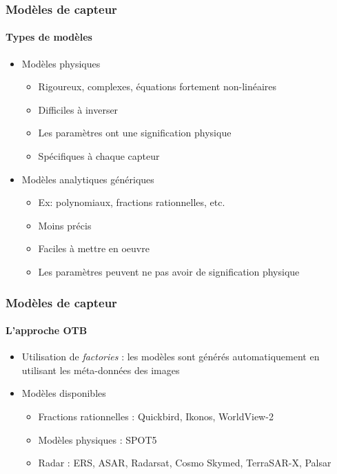 \documentclass[compress]{beamer}
\begin{document}
\begin{frame}
  \frametitle{Modèles de capteur}

  \framesubtitle{Types de modèles}
  \begin{itemize}
    \item Modèles physiques
      \begin{itemize}
	\item Rigoureux, complexes, équations fortement non-linéaires
	\item Difficiles à inverser
	\item Les paramètres ont une signification physique
	\item Spécifiques à chaque capteur
      \end{itemize}
    \item Modèles analytiques génériques
      \begin{itemize}
	\item Ex: polynomiaux, fractions rationnelles, etc.
	\item Moins précis
	\item Faciles à mettre en oeuvre
	\item Les paramètres peuvent ne pas avoir de signification physique
      \end{itemize}
  \end{itemize}

\end{frame}

\begin{frame}
  \frametitle{Modèles de capteur}

  \framesubtitle{L'approche OTB}
  \begin{itemize}
    \item Utilisation de {\em factories} : les modèles sont générés
      automatiquement en utilisant les méta-données des images
    \item Modèles disponibles
      \begin{itemize}
	\item Fractions rationnelles : Quickbird, Ikonos, WorldView-2
	\item Modèles physiques : SPOT5
	\item Radar : ERS, ASAR, Radarsat, Cosmo Skymed, TerraSAR-X, Palsar
      \end{itemize}
  \end{itemize}
\end{frame}
\end{document}

